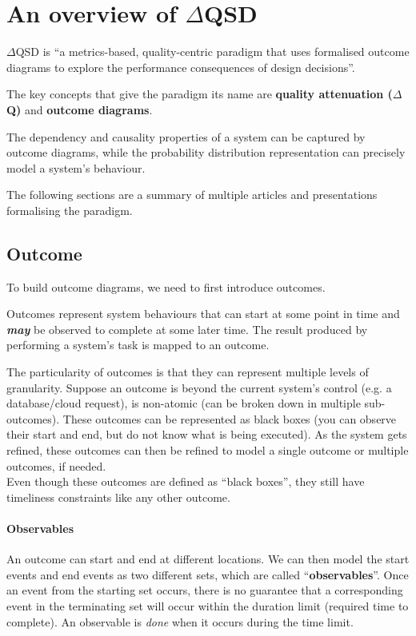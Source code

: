 \section{An overview of $\Delta$QSD}
    $\Delta$QSD is ``a metrics-based, quality-centric paradigm that uses formalised outcome diagrams to explore the performance consequences of design decisions''. \cite{myo}
    
    The key concepts that give the paradigm its name are \textbf{quality attenuation ($\Delta$Q)} and \textbf{outcome diagrams}. \cite{dq-tut}

    The dependency and causality properties of a system can be captured by outcome diagrams, while the probability distribution representation can precisely model a system's behaviour. \cite{myo}
 
    The following sections are a summary of multiple articles and presentations formalising the paradigm.
     
 \subsection{Outcome}
    To build outcome diagrams, we need to first introduce outcomes. 

        Outcomes represent system behaviours that can start at some point in time and \textit{\textbf{may}} be observed to complete at some later time. \cite{dq-br}
        The result produced by performing a system's task is mapped to an outcome. \cite{myo} 
     
        The particularity of outcomes is that they can represent multiple levels of granularity. Suppose an outcome is beyond the current system's control (e.g. a database/cloud request), is non-atomic (can be broken down in multiple sub-outcomes). These outcomes can be represented as black boxes (you can observe their start and end, but do not know what is being executed). As the system gets refined, these outcomes can then be refined to model a single outcome or multiple outcomes, if needed. \\ 
        Even though these outcomes are defined as ``black boxes'', they still have timeliness constraints like any other outcome. \cite{myo}

     \paragraph{Observables}
     An outcome can start and end at different locations. We can then model the start events and end events as two different sets, which are called ``\textbf{observables}''. \cite{myo}
Once an event from the starting set occurs, there is no guarantee that a corresponding event in the terminating set will occur within the duration limit (required time to complete). An observable is \textit{done} when it occurs during the time limit. \cite{art}

